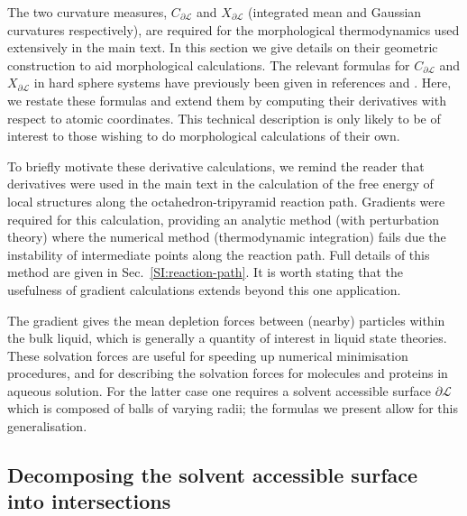 The two curvature measures, $C_{\partial\mathcal{L}}$ and $X_{\partial\mathcal{L}}$ (integrated mean and Gaussian curvatures respectively), are required for the morphological thermodynamics used extensively in the main text.
In this section we give details on their geometric construction to aid morphological calculations.
The relevant formulas for $C_{\partial\mathcal{L}}$ and $X_{\partial\mathcal{L}}$ in hard sphere systems have previously been given in references \cite{Mecke1994} and \cite{Roth2006}.
Here, we restate these formulas and extend them by computing their derivatives with respect to atomic coordinates.
This technical description is only likely to be of interest to those wishing to do morphological calculations of their own.

To briefly motivate these derivative calculations, we remind the reader that derivatives were used in the main text in the calculation of the free energy of local structures along the octahedron-tripyramid reaction path.
Gradients were required for this calculation, providing an analytic method (with perturbation theory) where the numerical method (thermodynamic integration) fails due the instability of intermediate points along the reaction path.
Full details of this method are given in Sec.\ \ref{SI:reaction-path}.
It is worth stating that the usefulness of gradient calculations extends beyond this one application.

The gradient gives the mean depletion forces between (nearby) particles within the bulk liquid, which is generally a quantity of interest in liquid state theories.
These solvation forces are useful for speeding up numerical minimisation procedures, and for describing the solvation forces for molecules and proteins in aqueous solution.
For the latter case one requires a solvent accessible surface $\partial{\mathcal{L}}$ which is composed of balls of varying radii; the formulas we present allow for this generalisation.

\subsection{Decomposing the solvent accessible surface into intersections}

